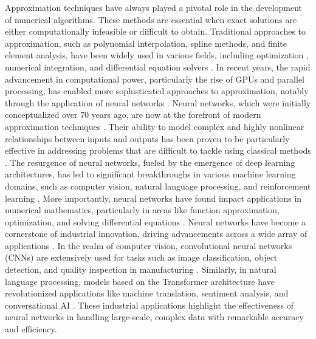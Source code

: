 \documentclass[final]{siamart220329}
\newtheorem{theoretical insights}{Theoretical insights}
\newtheorem{practical takeaway}{Practical takeaway}
\begin{document}
Approximation techniques have always played a pivotal role in the development of numerical algorithms. These methods are essential when exact solutions are either computationally infeasible or difficult to obtain. Traditional approaches to approximation, such as polynomial interpolation, spline methods, and finite element analysis, have been widely used in various fields, including optimization \cite{powell2006newuoa,wild2008orbit,xie2023derivativecombine,xie2024derivativetransform,XIE2025116146,xieyuannew,Xie_Yuan_2022,xie2025remuregionalminimalupdating}, numerical integration, and differential equation solvers \cite{bishop2006pattern}.  
In recent years, the rapid advancement in computational power, particularly the rise of GPUs and parallel processing, has enabled more sophisticated approaches to approximation, notably through the application of neural networks \cite{zhou2022towards}. Neural networks, which were initially conceptualized over 70 years ago, are now at the forefront of modern approximation techniques \cite{hornik1989multilayer, wu2024fedbiot, guolq}. Their ability to model complex and highly nonlinear relationships between inputs and outputs has been proven to be particularly effective in addressing problems that are difficult to tackle using classical methods \cite{goodfellow2016deep}. The resurgence of neural networks, fueled by the emergence of deep learning architectures, has led to significant breakthroughs in various machine learning domains, such as computer vision, natural language processing, and reinforcement learning \cite{lecun2015deep}. More importantly, neural networks have found impact applications in numerical mathematics, particularly in areas like function approximation, optimization, and solving differential equations \cite{larson2019derivative}.  
Neural networks have become a cornerstone of industrial innovation, driving advancements across a wide array of applications \cite{krizhevsky2012imagenet, liu2021swin, yang2024review,NEURIPS2020_44e76e99}. In the realm of computer vision, convolutional neural networks (CNNs) are extensively used for tasks such as image classification, object detection, and quality inspection in manufacturing \cite{krizhevsky2012imagenet}. Similarly, in natural language processing, models based on the Transformer architecture have revolutionized applications like machine translation, sentiment analysis, and conversational AI \cite{liu2021swin}. These industrial applications highlight the effectiveness of neural networks in handling large-scale, complex data with remarkable accuracy and efficiency.
\end{document}
